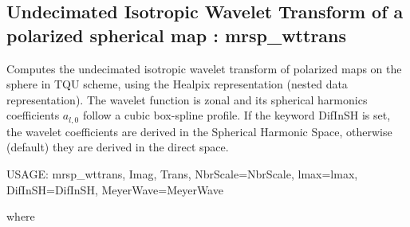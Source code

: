 \subsection{Undecimated Isotropic Wavelet Transform of a polarized spherical map : mrsp\_wttrans}
Computes the undecimated isotropic wavelet transform of polarized maps on the sphere in TQU scheme, 
using the Healpix representation (nested data representation). The wavelet function is zonal and its 
spherical harmonics coefficients $a_{l,0}$ follow a cubic box-spline profile. If the keyword DifInSH is 
set, the wavelet coefficients are derived in the Spherical Harmonic Space, otherwise (default) they 
are derived in the direct space.
{\bf
\begin{center}
     USAGE: mrsp\_wttrans, Imag, Trans, NbrScale=NbrScale, lmax=lmax, DifInSH=DifInSH, MeyerWave=MeyerWave
\end{center}}
where
